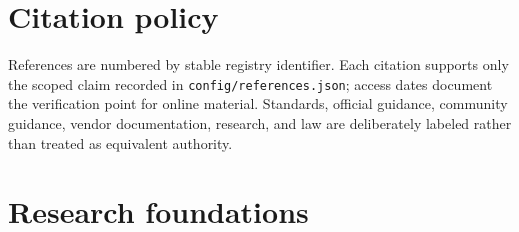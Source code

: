 
\section{Citation policy}

References are numbered by stable registry identifier. Each citation supports only the scoped claim recorded in \lstinline[style=bookinline]!config/references.json!; access dates document the verification point for online material. Standards, official guidance, community guidance, vendor documentation, research, and law are deliberately labeled rather than treated as equivalent authority.\par

\section{Research foundations}

